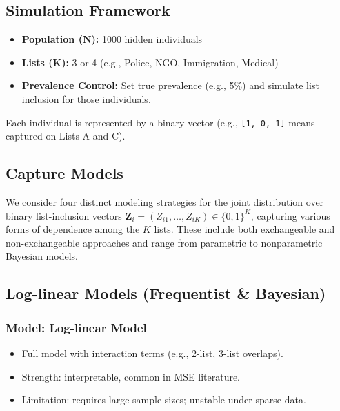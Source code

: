 \documentclass[
  12pt,
]{article}
\providecommand{\tightlist}{%
  \setlength{\itemsep}{0pt}\setlength{\parskip}{0pt}}\usepackage{longtable,booktabs,array}
\theoremstyle{plain}
\theoremstyle{definition}
\begin{document}
\subsection{Simulation Framework}\label{simulation-framework}

\begin{itemize}
\tightlist
\item
  \textbf{Population (N):} 1000 hidden individuals
\item
  \textbf{Lists (K):} 3 or 4 (e.g., Police, NGO, Immigration, Medical)
\item
  \textbf{Prevalence Control:} Set true prevalence (e.g., 5\%) and
  simulate list inclusion for those individuals.
\end{itemize}

Each individual is represented by a binary vector (e.g.,
\texttt{{[}1,\ 0,\ 1{]}} means captured on Lists A and C).

\subsection{Capture Models}\label{capture-models}

We consider four distinct modeling strategies for the joint distribution
over binary list-inclusion vectors
\(\mathbf{Z}_i = (Z_{i1}, \ldots, Z_{iK}) \in \{0,1\}^K\), capturing
various forms of dependence among the \(K\) lists. These include both
exchangeable and non-exchangeable approaches and range from parametric
to nonparametric Bayesian models.

\subsection{Log-linear Models (Frequentist \&
Bayesian)}\label{log-linear-models-frequentist-bayesian}

\subsubsection{Model: Log-linear Model}\label{model-log-linear-model}

\begin{itemize}
\tightlist
\item
  Full model with interaction terms (e.g., 2-list, 3-list overlaps).
\item
  Strength: interpretable, common in MSE literature.
\item
  Limitation: requires large sample sizes; unstable under sparse data.
\end{itemize}
\end{document}

